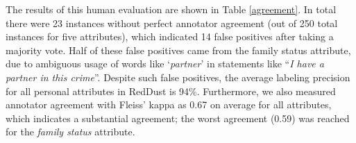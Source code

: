 The results of this human evaluation are shown in Table \ref{agreement}. In total there were 23 instances without perfect annotator agreement (out of 250 total instances for five attributes), which indicated 14 false positives after taking a majority vote. Half of these false positives came from the family status attribute, due to ambiguous usage of words like 
`\emph{partner}' in statements like ``\emph{I have a partner in this crime}''.
Despite such false positives, 
the average labeling precision for all personal attributes in RedDust is 94\%.
Furthermore, we also measured annotator agreement with Fleiss' kappa as 0.67 on average for all attributes, which indicates a substantial agreement; the worst agreement (0.59) was reached for the \textit{family status} attribute.